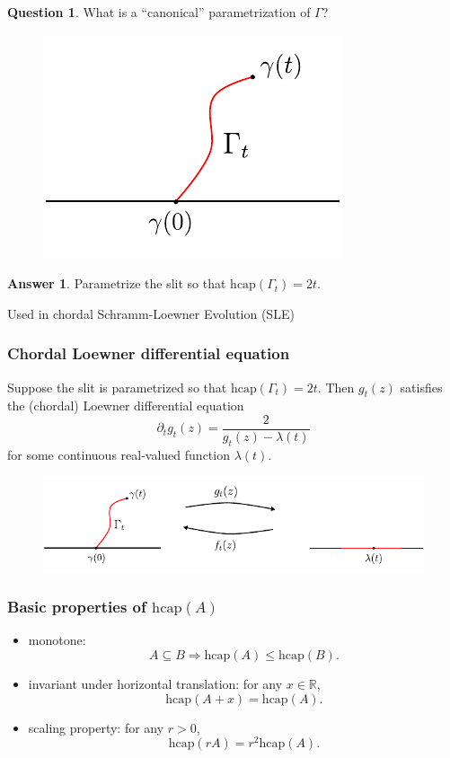 \documentclass[xcolor=pdftex,dvipsnames,table]{beamer}
\newcommand{\bbR}{\mathbb{R}}
\newcommand{\gl}{\lambda}
\newcommand{\gR}{\Gamma}
\newcommand{\hcap}{\text{hcap}}
\theoremstyle{definition}
\newtheorem{question}{Question}
\newtheorem{answer}{Answer}
\begin{document}
\begin{frame}
  \begin{question}
    What is a ``canonical'' parametrization of $\gR$?
  \end{question}
  \begin{figure}
    \includegraphics[scale=0.5]{figures/chordalSlit_02.pdf}
  \end{figure}
  \begin{answer}
    Parametrize the slit so that $\hcap(\gR_t) = 2t$.
  \end{answer}
  \vspace{0.1in}
  Used in chordal Schramm-Loewner Evolution (SLE)
\end{frame}

\begin{frame}
  \frametitle{Chordal Loewner differential equation}
  \begin{theorem}
    Suppose the slit is parametrized so that {\color{Red!100} $\hcap(\gR_t) = 2t$}. Then $g_t(z)$
    satisfies the (chordal) Loewner differential equation
    {\color{black!30}
    \[
        \partial_t g_t(z) = \frac{2}{g_t(z) - \gl(t)}
    \]
    for some continuous real-valued function $\gl(t)$.}
  \end{theorem}
  \begin{figure}
    \includegraphics[scale=0.9]{figures/chordal_f(z,t)_02.pdf}
  \end{figure}
\end{frame}

\begin{frame}
  \frametitle{Basic properties of $\hcap(A)$}
  \begin{itemize}
    \setlength{\itemsep}{0.3in}
    \item  monotone: \[A \subseteq B \Rightarrow \hcap(A) \leq \hcap(B).\]
    \item  invariant under horizontal translation: for any $x \in \bbR$, \[\hcap(A + x) = \hcap(A).\]
    \item  scaling property: for any $r > 0$, \[\hcap(r A) = r^2 \hcap(A).\]
  \end{itemize}
\end{frame}
\end{document}
